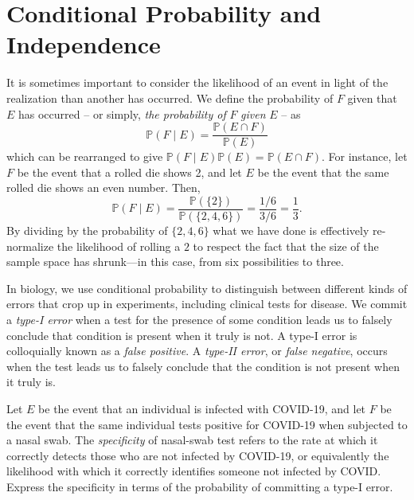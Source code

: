 \documentclass[../book.tex]{subfiles}
\begin{document}
\section{Conditional Probability and Independence}

It is sometimes important to consider the likelihood of an event in light of the realization than another has occurred. We define the probability of \(F\) given that \(E\) has occurred -- or simply, \emph{the probability of} \(F\) \emph{given} \(E\) -- as
\begin{equation}\label{eq:prob-4}
\mathbb{P}( F \mid  E) = \frac{\mathbb{P}(E \cap F)}{\mathbb{P}(E)}
\end{equation}
which can be rearranged to give \(\mathbb{P}( F \mid  E) \mathbb{P}(E) =  \mathbb{P}(E \cap F)\). For instance, let \(F\) be the event that a rolled die shows 2, and let \(E\) be the event that the same rolled die shows an even number. Then,
\begin{equation}\label{eq:prob-5}
\mathbb{P}( F \mid  E) 
=
\frac{\mathbb{P}( \{ 2\} )}{ \mathbb{P}( \{ 2, 4, 6\}) } = \frac{1/6}{3/6} = \frac{1}{3}.
\end{equation}
By dividing by the probability of \(\{ 2, 4, 6\}\) what we have done is effectively re-normalize the likelihood of rolling a \(2\) to respect the fact that the size of the sample space has shrunk---in this case, from six possibilities to three.

In biology, we use conditional probability to distinguish between different kinds of errors that crop up in experiments, including clinical tests for disease. We commit a {\it type-I
error} when a test for the presence of some condition leads us to falsely conclude that condition is present when it truly is not. A type-I error is colloquially known as a \emph{false positive}. A \emph{type-II error}, or \emph{false negative}, occurs when the test leads us to falsely conclude that the condition is not present when it truly is. %

\begin{example} \label{eg:covid}
Let \(E\) be the event that an individual is infected with COVID-19, and let \(F\) be the event that the same individual tests positive for COVID-19 when subjected to a nasal swab. The \emph{specificity} of nasal-swab test refers to the rate at which it correctly detects those who are not infected by COVID-19, or equivalently the likelihood with which it correctly identifies someone not infected by COVID. Express the specificity in terms of the probability of committing a type-I error.
\end{example}
\end{document}
